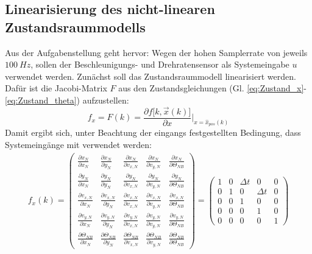 \documentclass[12pt,a4paper]{article}
\begin{document}
	\subsection{Linearisierung des nicht-linearen Zustandsraummodells}\label{subsec:Linearisierung}
	Aus der Aufgabenstellung geht hervor: Wegen der hohen Samplerrate von jeweils $100~Hz$, sollen der Beschleunigungs- und Drehratensensor als Systemeingabe $u$ verwendet werden.
	Zunächst soll das Zustandsraummodell linearisiert werden. Dafür ist die Jacobi-Matrix $F$ aus den Zustandsgleichungen (Gl. \ref{eq:Zustand_x}-\ref{eq:Zustand_theta}) aufzustellen:
	\begin{equation}
		f_{x}=F(k)=\frac{\partial f\big[k, \vec{x}(k)\big]}{\partial x}\Bigg \vert_{x=\hat{x}_{pos}(k)}
	\end{equation}
	Damit ergibt sich, unter Beachtung der eingangs festgestellten Bedingung, dass Systemeingänge mit verwendet werden:
	\begin{gather}f_{x}(k)=
		\begin{pmatrix}
			\frac{\partial x_{N}}{\partial x_{N}} & \frac{\partial x_{N}}{\partial y_{N}} & \frac{\partial x_{N}}{\partial v_{x,N}} & \frac{\partial x_{N}}{\partial v_{y,N}} & \frac{\partial x_{N}}{\partial \Theta_{NB}} \\[0.5em]
			\frac{\partial y_{N}}{\partial x_{N}} & \frac{\partial y_{N}}{\partial y_{N}} & \frac{\partial y_{N}}{\partial v_{x,N}} & \frac{\partial y_{N}}{\partial v_{y,N}} & \frac{\partial y_{N}}{\partial \Theta_{NB}} \\[0.5em]
			\frac{\partial v_{x,N}}{\partial x_{N}} & \frac{\partial v_{x,N}}{\partial y_{N}} & \frac{\partial v_{x,N}}{\partial v_{x,N}} & \frac{\partial v_{x,N}}{\partial v_{y,N}} & \frac{\partial v_{x,N}}{\partial \Theta_{NB}} \\[0.5em]
			\frac{\partial v_{y,N}}{\partial x_{N}} & \frac{\partial v_{y,N}}{\partial y_{N}} & \frac{\partial v_{y,N}}{\partial v_{x,N}} & \frac{\partial v_{y,N}}{\partial v_{y,N}} & \frac{\partial v_{y,N}}{\partial \Theta_{NB}} \\[0.5em]
			\frac{\partial \Theta_{NB}}{\partial x_{N}} & \frac{\partial \Theta_{NB}}{\partial y_{N}} & \frac{\partial \Theta_{NB}}{\partial v_{x,N}} & \frac{\partial \Theta_{NB}}{\partial v_{y,N}} & \frac{\partial \Theta_{NB}}{\partial \Theta_{NB}}
		\end{pmatrix}=
		\begin{pmatrix}
			1 & 0 & \Delta t & 0 & 0 \\[0.5em]
			0 & 1 & 0 & \Delta t & 0 \\[0.5em]
			0 & 0 & 1 & 0 & 0 \\[0.5em]
			0 & 0 & 0 & 1 & 0 \\[0.5em]
			0 & 0 & 0 & 0 & 1
		\end{pmatrix}
	\end{gather}
\end{document}
